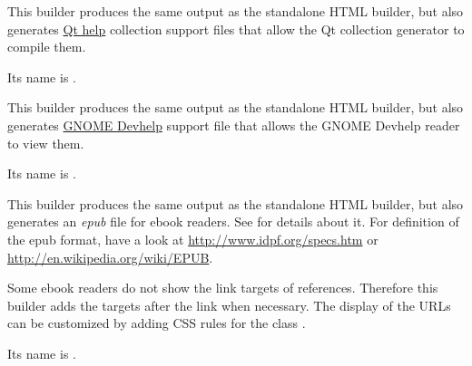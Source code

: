 \documentclass[letterpaper,10pt,english]{sphinxmanual}
\begin{document}
\label{builders:module-sphinx.builders.qthelp}

\begin{fulllineitems}
\label{builders:sphinx.builders.qthelp.QtHelpBuilder}
This builder produces the same output as the standalone HTML builder, but
also generates \href{http://doc.trolltech.com/4.6/qthelp-framework.html}{Qt help} collection support files that allow
the Qt collection generator to compile them.

Its name is .

\end{fulllineitems}

\label{builders:module-sphinx.builders.devhelp}

\begin{fulllineitems}
\label{builders:sphinx.builders.devhelp.DevhelpBuilder}
This builder produces the same output as the standalone HTML builder, but
also generates \href{http://live.gnome.org/devhelp}{GNOME Devhelp}
support file that allows the GNOME Devhelp reader to view them.

Its name is .

\end{fulllineitems}

\label{builders:module-sphinx.builders.epub}

\begin{fulllineitems}
\label{builders:sphinx.builders.epub.EpubBuilder}
This builder produces the same output as the standalone HTML builder, but
also generates an \emph{epub} file for ebook readers.  See {\hyperref[faq:epub\string-faq]{}} for
details about it.  For definition of the epub format, have a look at
\url{http://www.idpf.org/specs.htm} or \url{http://en.wikipedia.org/wiki/EPUB}.

Some ebook readers do not show the link targets of references.  Therefore
this builder adds the targets after the link when necessary.  The display
of the URLs can be customized by adding CSS rules for the class
.

Its name is .

\end{fulllineitems}
\end{document}
